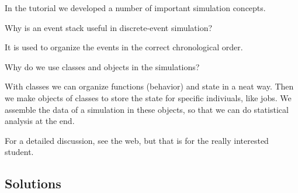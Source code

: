 In the tutorial we developed a number of important simulation concepts.

\begin{exercise}[201904, 1]
Why is  an event stack useful in discrete-event simulation? 
\begin{solution}
  It is used to organize the events in the correct chronological order. 
\end{solution}
\end{exercise}


\begin{exercise}[201904, 1]
  Why do we use classes and objects in the simulations?
\begin{solution}
  With classes we can organize functions (behavior) and state in a neat way.
  Then we make objects of classes to store the state for specific indiviuals, like jobs.
  We assemble the data of a simulation in these objects, so that we can do statistical analysis at the end.

  For a detailed discussion, see the web, but that is for the really interested student.
\end{solution}
\end{exercise}


\subsection*{Solutions}




